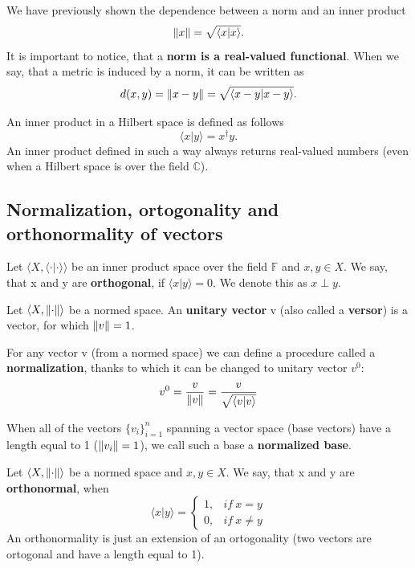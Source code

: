 \begin{remark}
We have previously shown the dependence between a norm and an inner product
\[ \left\lVert x\right\rVert = \sqrt{\langle x | x \rangle}. \]
It is important to notice, that a \textbf{norm is a real-valued functional}. When we say, that a metric is induced by a norm, it can be written as
\[  d(x, y) = \left\lVert x - y\right\rVert = \sqrt{\langle x-y | x-y \rangle}. \]
\end{remark}

\begin{remark}
An inner product in a Hilbert space is defined as follows
\[ \langle x | y \rangle = x^\dagger y.\]
An inner product defined in such a way always returns real-valued numbers (even when a Hilbert space is over the field $\mathbb{C}$).
\end{remark}

\subsection{Normalization, ortogonality and orthonormality of vectors}

\begin{definition}
Let $\langle X, \langle \cdot | \cdot \rangle \rangle$ be an inner product space over the field $\mathbb{F}$ and $x,y \in X$. We say, that x and y are \textbf{orthogonal}, if $\langle x | y\rangle = 0$. We denote this as $x \perp y$.
\end{definition}

\begin{definition}
Let $\langle X , \left\lVert\cdot\right\rVert \rangle$ be a normed space. An \textbf{unitary vector} v (also called a \textbf{versor}) is a vector, for which $\left\lVert v\right\rVert = 1$.
\end{definition}

\begin{remark}
For any vector v (from a normed space) we can define a procedure called a \textbf{normalization}, thanks to which it can be changed to unitary vector $v^0$:
\[ v^0 = \frac{v}{\left\lVert v\right\rVert} = \frac{v}{\sqrt{\langle v | v \rangle}} \]
\end{remark}

\begin{remark}
When all of the vectors $\{v_i\}_{i=1}^n$ spanning a vector space (base vectors) have a length equal to 1 ($\left\lVert v_i\right\rVert = 1$), we call such a base a \textbf{normalized base}.
\end{remark}

\begin{definition}
Let $\langle X, \left\lVert\cdot\right\rVert \rangle$ be a normed space and $x,y \in X$. We say, that x and y are \textbf{orthonormal}, when
\[ \langle x | y \rangle = 
\begin{cases} 
    1, & if \  x = y \\
    0, & if \  x \neq y
\end{cases}
\]
An orthonormality is just an extension of an ortogonality (two vectors are ortogonal and have a length equal to 1).
\end{definition}

